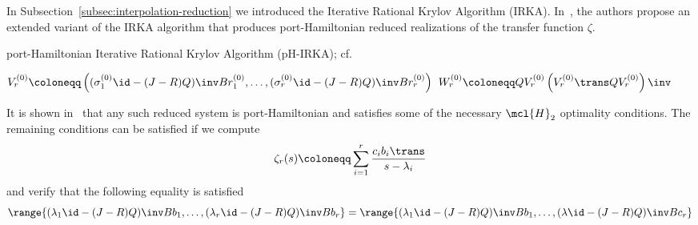 

In Subsection~\ref{subsec:interpolation-reduction} we introduced the Iterative Rational Krylov Algorithm (IRKA).
In~\cite{Gugercin2012}, the authors propose an extended variant of the IRKA algorithm that produces port-Hamiltonian reduced realizations of the transfer function $\zeta$.

\begin{algorithm}\label{alg:ph-irka}
    \caption{port-Hamiltonian Iterative Rational Krylov Algorithm (pH-IRKA); cf.~\cite[Algorithm~1]{Gugercin2012}}
    $V_r^{(0)} \coloneqq \left( {(\sigma_1^{(0)} \id - (J - R) Q)}\inv B r_1^{(0)}, \dots, {(\sigma_r^{(0)} \id - (J - R) Q)}\inv B r_r^{(0)} \right)$\;
    $W_r^{(0)} \coloneqq Q V_r^{(0)} \left( {V_r^{(0)}}\trans Q V_r^{(0)} \right)\inv$\;
\end{algorithm}

It is shown in~\cite[Theorem~11]{Gugercin2012} that any such reduced system is port-Hamiltonian and satisfies some of the necessary $\mcl{H}_2$ optimality conditions.
The remaining conditions can be satisfied if we compute
\begin{equation*}
    \zeta_r(s) \coloneqq \sum\limits_{i = 1}^r \frac{c_i b_i\trans}{s - \lambda_i}
\end{equation*}
and verify that the following equality is satisfied
\begin{equation*}
    \range{{(\lambda_1 \id - (J - R) Q)}\inv B b_1, \dots, {(\lambda_r \id - (J - R) Q)}\inv B b_r} = \range{{(\lambda_1 \id - (J - R) Q)}\inv B b_1, \dots, {(\lambda \id - (J - R) Q)}\inv B c_r}
\end{equation*}

